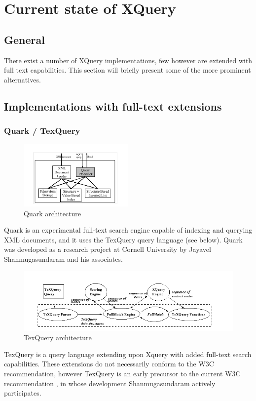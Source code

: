 \section{Current state of XQuery}
\subsection{General}
There exist a number of XQuery implementations, few however are extended with full text capabilities. This section will briefly present some of the more prominent alternatives.
\subsection{Implementations with full-text extensions}
\subsubsection{Quark / TexQuery}
\begin{figure}[!h]
  \centering
    \includegraphics[width=0.5\textwidth]{img/quark_architecture.png}
  \caption{Quark architecture}
\end{figure}
Quark is an experimental full-text search engine capable of indexing and querying XML documents, and it uses the TexQuery query language (see below). Quark was developed as a research project at Cornell University by Jayavel Shanmugasundaram and his associates.
\begin{figure}[!h]
  \centering
    \includegraphics[width=1\textwidth]{img/texquery_architecture.png}
  \caption{TexQuery architecture}
\end{figure}
TexQuery is a query language extending upon Xquery with added full-text search capabilities. These extensions do not necessarily conform to the W3C recommendation, however TexQuery is an early precursor to the current W3C recommendation \cite{TEXQ00}, in whose development Shanmugasundaram actively participates.

